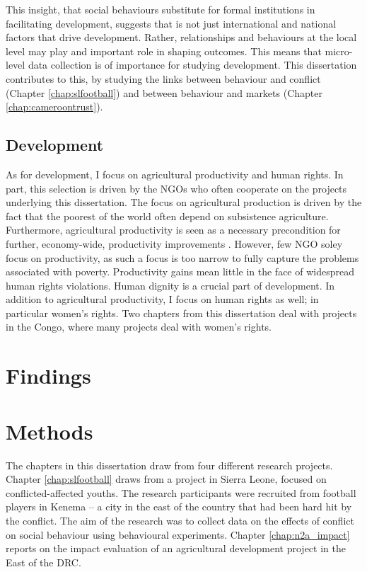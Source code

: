 This insight, that social behaviours substitute for formal institutions in facilitating development, suggests that is not just international and national factors that drive development. Rather, relationships and behaviours at the local level may play and important role in shaping outcomes. This means that micro-level data collection is of importance for studying development. This dissertation contributes to this, by studying the links between behaviour and conflict (Chapter \ref{chap:slfootball}) and between behaviour and markets (Chapter \ref{chap:cameroontrust}).

\subsection{Development}
As for development, I focus on agricultural productivity and human rights. In part, this selection is driven by the NGOs who often cooperate on the projects underlying this dissertation. The focus on agricultural production is driven by the fact that the poorest of the world often depend on subsistence agriculture. Furthermore, agricultural productivity is seen as a necessary precondition for further, economy-wide, productivity improvements \citep{WorldBank2008}. However, few NGO soley focus on productivity, as such a focus is too narrow to fully capture the problems associated with poverty. Productivity gains mean little in the face of widespread human rights violations. Human dignity is a crucial part of development. In addition to agricultural productivity, I focus on human rights as well; in particular women's rights. Two chapters from this dissertation deal with projects in the Congo, where many projects deal with women's rights.


\section{Findings}


\section{Methods}
The chapters in this dissertation draw from four different research projects. Chapter \ref{chap:slfootball} draws from a project in Sierra Leone, focused on conflicted-affected youths. The research participants were recruited from football players in Kenema -- a city in the east of the country that had been hard hit by the conflict. The aim of the research was to collect data on the effects of conflict on social behaviour using behavioural experiments. Chapter \ref{chap:n2a_impact} reports on the impact evaluation of an agricultural development project in the East of the DRC. 

